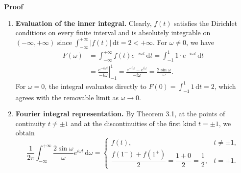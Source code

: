 \documentclass[11pt,a4paper]{article}
\theoremstyle{definition}
\theoremstyle{plain}
\begin{document}
\textbf{Proof}\par\nopagebreak[4]
\begin{enumerate}
\item \textbf{Evaluation of the inner integral.} Clearly, $f(t)$ satisfies the Dirichlet conditions on every finite interval and is absolutely integrable on $(-\infty, +\infty)$ since $\int_{-\infty}^{+\infty} |f(t)| \, \mathrm{d}t = 2 < +\infty$. For $\omega \neq 0$, we have
\begin{align*}
F(\omega) &= \int_{-\infty}^{+\infty} f(t) e^{-i\omega t} \, \mathrm{d}t = \int_{-1}^{1} 1 \cdot e^{-i\omega t} \, \mathrm{d}t \\
&= \left. \frac{e^{-i\omega t}}{-i\omega} \right|_{-1}^{1} = \frac{e^{-i\omega} - e^{i\omega}}{-i\omega} = \frac{2\sin \omega}{\omega}.
\end{align*}
For $\omega = 0$, the integral evaluates directly to $F(0) = \int_{-1}^{1} 1 \, \mathrm{d}t = 2$, which agrees with the removable limit as $\omega \to 0$.

\item \textbf{Fourier integral representation.} By Theorem 3.1, at the points of continuity $t \neq \pm 1$ and at the discontinuities of the first kind $t = \pm 1$, we obtain
\begin{equation}
\frac{1}{2\pi} \int_{-\infty}^{+\infty} \frac{2\sin \omega}{\omega} e^{i\omega t} \, \mathrm{d}\omega
=
\begin{cases}
f(t), & t \neq \pm 1, \\[10pt]
\dfrac{f(1^-) + f(1^+)}{2} = \dfrac{1 + 0}{2} = \dfrac{1}{2}, & t = \pm 1.
\end{cases}
\end{equation}


\end{enumerate}
\end{document}
